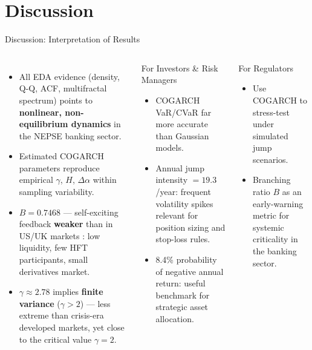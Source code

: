 \documentclass[10pt, aspectratio=169]{beamer}
\begin{document}
\section{Discussion}

\begin{frame}{Discussion: Interpretation of Results}
\begin{columns}[T]
  \begin{itemize}
    \item All EDA evidence (density, Q-Q, ACF, multifractal spectrum)
          points to \textbf{nonlinear, non-equilibrium dynamics} in the
          NEPSE banking sector.
    \item Estimated COGARCH parameters reproduce empirical $\gamma$,
          $H$, $\Delta\alpha$ within sampling variability.
    \item $B=0.7468$ — self-exciting feedback \textbf{weaker} than in
          US/UK markets \cite{hardiman2013critical}: low liquidity,
          few HFT participants, small derivatives market.
    \item $\gamma\approx 2.78$ implies \textbf{finite variance}
          ($\gamma>2$) — less extreme than crisis-era developed markets,
          yet close to the critical value $\gamma=2$.
  \end{itemize}
  \begin{block}{For Investors \& Risk Managers}
    \begin{itemize}\small
      \item COGARCH VaR/CVaR far more accurate than Gaussian models.
      \item Annual jump intensity $=19.3$/year: frequent volatility
            spikes relevant for position sizing and stop-loss rules.
      \item 8.4\% probability of negative annual return: useful
            benchmark for strategic asset allocation.
    \end{itemize}
  \end{block}
  \vspace{0.2cm}
  \begin{block}{For Regulators}
    \begin{itemize}\small
      \item Use COGARCH to stress-test under simulated jump scenarios.
      \item Branching ratio $B$ as an early-warning metric for
            systemic criticality in the banking sector.
    \end{itemize}
  \end{block}
\end{columns}
\end{frame}
\end{document}
